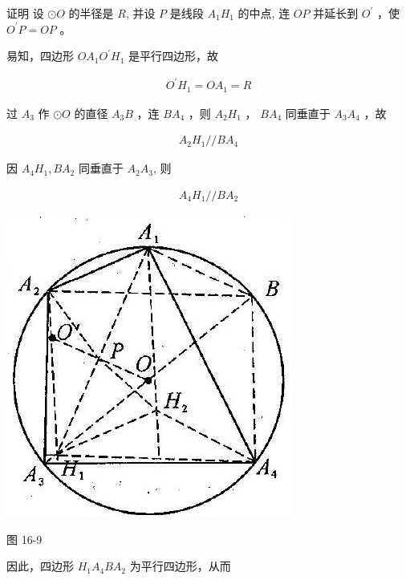 \documentclass[10pt]{article}
\begin{document}
证明 设 $\odot O$ 的半径是 $R$, 并设 $P$ 是线段 $A_{1} H_{1}$ 的中点, 连 $O P$ 并延长到 $O^{\prime}$ ，使 $O^{\prime} P=O P$ 。

易知，四边形 $O A_{1} O^{\prime} H_{1}$ 是平行四边形，故

\begin{align*}
O^{\prime} H_{1}=O A_{1}=R
\end{align*}

过 $A_{3}$ 作 $\odot O$ 的直径 $A_{3} B$ ，连 $B A_{4}$ ，则 $A_{2} H_{1}$ ， $B A_{4}$ 同垂直于 $A_{3} A_{4}$ ，故

\begin{align*}
A_{2} H_{1} / / B A_{4}
\end{align*}

因 $A_{4} H_{1}, B A_{2}$ 同垂直于 $A_{2} A_{3}$, 则

\begin{align*}
A_{4} H_{1} / / B A_{2}
\end{align*}

\begin{center}
\includegraphics[max width=\textwidth]{2024_10_30_2c8f45efd4a519b08e1ag-152(1)}
\end{center}

图 16-9

因此，四边形 $H_{1} A_{4} B A_{2}$ 为平行四边形，从而
\end{document}

